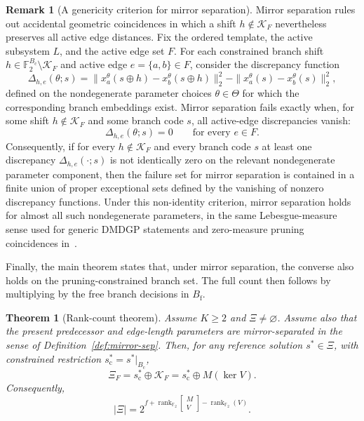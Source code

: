 \documentclass[11pt]{article}
\theoremstyle{plain}
\newtheorem{theorem}{Theorem}
\theoremstyle{definition}
\newtheorem{remark}{Remark}
\begin{document}
\begin{remark}[A genericity criterion for mirror separation]
\label{rem:mirror-separation-genericity}
Mirror separation rules out accidental geometric coincidences in which a shift $h\notin\mathcal{K}_F$ nevertheless preserves all active edge distances. Fix the ordered template, the active subsystem $L$, and the active edge set $F$. For each constrained branch shift $h\in\mathbb{F}_2^{B_{\mathrm{c}}}\setminus\mathcal{K}_F$ and active edge $e=\{a,b\}\in F$, consider the discrepancy function
\[
\Delta_{h,e}(\theta;s)
=
\|x^\theta_a(s\oplus h)-x^\theta_b(s\oplus h)\|_2^2
-
\|x^\theta_a(s)-x^\theta_b(s)\|_2^2,
\]
defined on the nondegenerate parameter choices $\theta\in\Theta$ for which the corresponding branch embeddings exist. Mirror separation fails exactly when, for some shift $h\notin\mathcal{K}_F$ and some branch code $s$, all active-edge discrepancies vanish:
\[
\Delta_{h,e}(\theta;s)=0
\qquad
\text{for every } e\in F.
\]
Consequently, if for every $h\notin\mathcal{K}_F$ and every branch code $s$ at least one discrepancy $\Delta_{h,e}(\cdot;s)$ is not identically zero on the relevant nondegenerate parameter component, then the failure set for mirror separation is contained in a finite union of proper exceptional sets defined by the vanishing of nonzero discrepancy functions. Under this non-identity criterion, mirror separation holds for almost all such nondegenerate parameters, in the same Lebesgue-measure sense used for generic DMDGP statements and zero-measure pruning coincidences in~\cite{liberti2012discretizable}.
\end{remark}

Finally, the main theorem states that, under mirror separation, the converse also holds on the pruning-constrained branch set. The full count then follows by multiplying by the free branch decisions in $B_{\mathrm{f}}$.

\begin{theorem}[Rank-count theorem]
\label{thm:main}
Assume $K \ge 2$ and $\Xi \ne \varnothing$. Assume also that the present predecessor and edge-length parameters are mirror-separated in the sense of Definition~\ref{def:mirror-sep}. Then, for any reference solution $s^\ast \in \Xi$, with constrained restriction $s^\ast_{\mathrm{c}}=s^\ast|_{B_{\mathrm{c}}}$,
\[
\Xi_F
=
s^\ast_{\mathrm{c}} \oplus \mathcal{K}_F
=
s^\ast_{\mathrm{c}} \oplus M(\ker V).
\]
Consequently,
\[
\lvert \Xi\rvert
=
2^{
f+
\operatorname{rank}_{\mathbb{F}_2}\begin{bmatrix} M \\ V \end{bmatrix}
-
\operatorname{rank}_{\mathbb{F}_2}(V)
}.
\]
\end{theorem}
\end{document}
